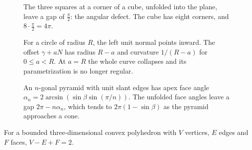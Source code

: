 \begin{figure}[ht]
\centering
{}
\caption{The three squares at a corner of a cube, unfolded into the plane, leave a gap of $\frac\pi2$: the angular defect. The cube has eight corners, and
$8\cdot\frac\pi2=4\pi$.}
\label{geometry:fig:defect}
\end{figure}

\begin{figure}[ht]
\centering{}
\caption{For a circle of radius $R$, the left unit normal points inward. The offset $\gamma+aN$ has radius $R-a$ and curvature $1/(R-a)$ for $0\le a<R$. At $a=R$ the whole curve collapses and its parametrization is no longer regular.}
\label{fig:v9-app-k-turning-offset}
\end{figure}

\begin{figure}[ht]
\centering{}
\caption{An $n$-gonal pyramid with unit slant edges has apex face angle $\alpha_n=2\arcsin(\sin\beta\sin(\pi/n))$. The unfolded face angles leave a gap $2\pi-n\alpha_n$, which tends to $2\pi(1-\sin\beta)$ as the pyramid approaches a cone.}
\label{fig:v9-app-k-pyramid-defect}
\end{figure}

\begin{theorem}[Euler, 1758]\label{geometry:thm:euler}
For a bounded three-dimensional convex polyhedron with $V$ vertices, $E$ edges and $F$ faces, $V-E+F=2$.
\end{theorem}

